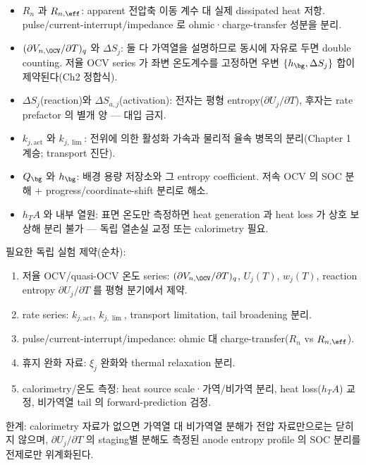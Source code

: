 \begin{itemize}
\item $R_n$ 과 $R_{n,\eff}$: apparent 전압축 이동 계수 대 실제 dissipated heat 저항. pulse/current-interrupt/impedance
  로 ohmic·charge-transfer 성분을 분리.
\item $(\partial V_{n,\OCV}/\partial T)_q$ 와 $\Delta S_j$: 둘 다 가역열을 설명하므로 동시에 자유로 두면 double
  counting. 저율 OCV series 가 좌변 온도계수를 고정하면 우변 $\{h_\bg,\Delta S_j\}$ 합이 제약된다(Ch2 정합식).
\item $\Delta S_j$(reaction)와 $\Delta S_{a,j}$(activation): 전자는 평형 entropy($\partial U_j/\partial T$),
  후자는 rate prefactor 의 별개 양 — 대입 금지.
\item $k_{j,\mathrm{act}}$ 와 $k_{j,\lim}$: 전위에 의한 활성화 가속과 물리적 율속 병목의 분리(Chapter 1 계승; transport 진단).
\item $Q_\bg$ 와 $h_\bg$: 배경 용량 저장소와 그 entropy coefficient. 저속 OCV 의 SOC 분해 + progress/coordinate-shift 분리로 해소.
\item $h_T A$ 와 내부 열원: 표면 온도만 측정하면 heat generation 과 heat loss 가 상호 보상해 분리 불가 — 독립 열손실 교정 또는 calorimetry 필요.
\end{itemize}
필요한 독립 실험 제약(순차):
\begin{enumerate}
\item 저율 OCV/quasi-OCV 온도 series: $(\partial V_{n,\OCV}/\partial T)_q$, $U_j(T)$, $w_j(T)$, reaction entropy $\partial U_j/\partial T$ 를 평형 분기에서 제약.
\item rate series: $k_{j,\mathrm{act}}$, $k_{j,\lim}$, transport limitation, tail broadening 분리.
\item pulse/current-interrupt/impedance: ohmic 대 charge-transfer($R_n$ vs $R_{n,\eff}$).
\item 휴지 완화 자료: $\xi_j$ 완화와 thermal relaxation 분리.
\item calorimetry/온도 측정: heat source scale·가역/비가역 분리, heat loss($h_T A$) 교정, 비가역열 tail 의 forward-prediction 검정.
\end{enumerate}
한계: calorimetry 자료가 없으면 가역열 대 비가역열 분해가 전압 자료만으로는 닫히지 않으며, $\partial U_j/\partial T$ 의
staging별 분해도 측정된 anode entropy profile 의 SOC 분리를 전제로만 위계화된다.
